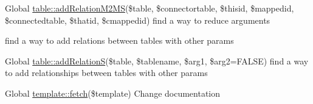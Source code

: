 \label{todo__todo000006}
\hypertarget{todo__todo000006}{}
 
\begin{DoxyDescription}
\item[Global \hyperlink{classtable_a9b398e8dfd316739e74a7d19f2d988f0}{table::addRelationM2MS}(\$table, \$connectortable, \$thisid, \$mappedid, \$connectedtable, \$thatid, \$cmappedid) ]find a way to reduce arguments 

find a way to add relations between tables with other params 
\end{DoxyDescription}

\label{todo__todo000007}
\hypertarget{todo__todo000007}{}
 
\begin{DoxyDescription}
\item[Global \hyperlink{classtable_aa3af4eeabe0a499ae25ef80fc93abbbd}{table::addRelationS}(\$table, \$tablename, \$arg1, \$arg2=FALSE) ]find a way to add relationships between tables with other params 
\end{DoxyDescription}

\label{todo__todo000009}
\hypertarget{todo__todo000009}{}
 
\begin{DoxyDescription}
\item[Global \hyperlink{classtemplate_a69b8a525840eb80f0e5a1df9cd22b04c}{template::fetch}(\$template) ]Change documentation 
\end{DoxyDescription}